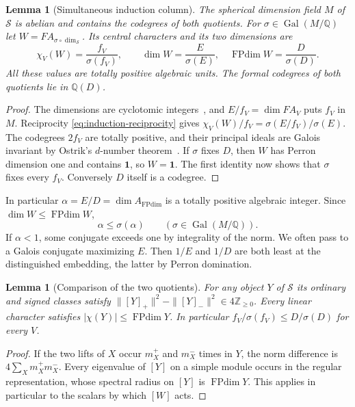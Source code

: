 \documentclass[11pt,reqno]{amsart}
\newtheorem{lemma}[theorem]{Lemma}
\theoremstyle{remark}\newtheorem{remark}[theorem]{Remark}
\numberwithin{equation}{section}
\begin{document}
\begin{lemma}[Simultaneous induction column]\label{lem:central-witness}
The spherical dimension field $M$ of $\mathcal S$ is abelian and
contains the codegrees of both quotients. For $\sigma\in\operatorname{Gal}(M/\mathbb Q)$
let $W=F A_{\sigma\circ\dim_{\mathcal S}}$. Its central characters and its two dimensions are
\[
  \chi_V(W)=\frac{f_V}{\sigma(f_V)},\qquad
  \dim W=\frac{E}{\sigma(E)},\quad
  \operatorname{FPdim}W=\frac{D}{\sigma(D)} .
\]
All these values are totally positive algebraic units. The formal
codegrees of both quotients lie in $\mathbb Q(D)$.
\end{lemma}
\begin{proof}
The dimensions are cyclotomic integers~\cite[Theorem~8.51]{ENO},
and $E/f_V=\dim F A_V$ puts $f_V$ in $M$. Reciprocity
\eqref{eq:induction-reciprocity} gives
$\chi_V(W)/f_V=\sigma(E/f_V)/\sigma(E)$.
The codegrees $2f_V$ are totally positive, and their principal
ideals are Galois invariant by Ostrik's $d$-number theorem~\cite{OstrikCodegrees}. If $\sigma$ fixes $D$, then $W$ has Perron dimension
one and contains $\mathbf1$, so $W=\mathbf1$. The first identity
now shows that $\sigma$ fixes every $f_V$. Conversely $D$ itself
is a codegree.
\end{proof}

In particular $\alpha=E/D=\dim A_{\operatorname{FPdim}}$ is a totally
positive algebraic integer. Since $\dim W\le\operatorname{FPdim}W$,
\begin{equation}\label{eq:least-ratio}
 \alpha\le\sigma(\alpha)\qquad(\sigma\in\operatorname{Gal}(M/\mathbb Q)).
\end{equation}
If $\alpha<1$, some conjugate exceeds one by integrality of the norm.
We often pass to a Galois conjugate maximizing $E$. Then $1/E$
and $1/D$ are both least at the distinguished embedding, the latter
by Perron domination.

\begin{lemma}[Comparison of the two quotients]\label{lem:column-comparison}
For any object $Y$ of $\mathcal S$ its ordinary and signed classes
satisfy $\|[Y]_+\|^2-\|[Y]_-\|^2\in4\mathbb Z_{\ge0}$.
Every linear character satisfies $|\chi(Y)|\le\operatorname{FPdim}Y$.
In particular $f_V/\sigma(f_V)\le D/\sigma(D)$ for every $V$.
\end{lemma}
\begin{proof}
If the two lifts of $X$ occur $m_X^+$ and $m_X^-$ times in $Y$,
the norm difference is $4\sum_X m_X^+m_X^-$. Every eigenvalue of
$[Y]$ on a simple module occurs in the regular representation, whose
spectral radius on $[Y]$ is $\operatorname{FPdim}Y$. This applies
in particular to the scalars by which $[W]$ acts.
\end{proof}
\end{document}
